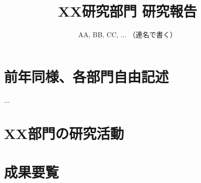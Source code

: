 \documentclass[11pt]{jarticle}
\title{XX研究部門 研究報告}
\author{AA, BB, CC, ... （連名で書く）}
\begin{document}
\maketitle

\section{前年同様、各部門自由記述}
...

\section{XX部門の研究活動}




\section{成果要覧}


\end{document}

